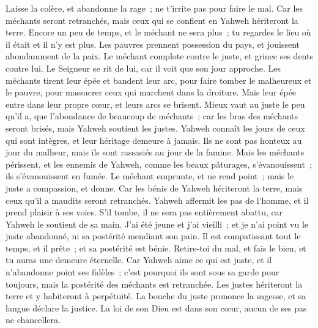 \begin{multicols}{2}
 Laisse la colère, et abandonne la rage~; ne t'irrite pas pour faire le mal.
Car les méchants seront retranchés, mais ceux qui se confient en Yahweh hériteront la terre.
 Encore un peu de temps, et le méchant ne sera plus~; tu regardes le lieu où il était et il n'y est plus.
Les pauvres prennent possession du pays, et jouissent abondamment de la paix.
 Le méchant complote contre le juste, et grince ses dents contre lui.
Le Seigneur se rit de lui, car il voit que son jour approche.
 Les méchants tirent leur épée et bandent leur arc, pour faire tomber le malheureux et le pauvre, pour massacrer ceux qui marchent dans la droiture.
Mais leur épée entre dans leur propre cœur, et leurs arcs se brisent.
 Mieux vaut au juste le peu qu'il a, que l'abondance de beaucoup de méchants~;
car les bras des méchants seront brisés, mais Yahweh soutient les justes.
 Yahweh connaît les jours de ceux qui sont intègres, et leur héritage demeure à jamais.
Ils ne sont pas honteux au jour du malheur, mais ils sont rassasiés au jour de la famine.
 Mais les méchants périssent, et les ennemis de Yahweh, comme les beaux pâturages, s'évanouissent~; ils s'évanouissent en fumée.
 Le méchant emprunte, et ne rend point~; mais le juste a compassion, et donne.
Car les bénis de Yahweh hériteront la terre, mais ceux qu'il a maudits seront retranchés.
 Yahweh affermit les pas de l'homme, et il prend plaisir à ses voies.
S'il tombe, il ne sera pas entièrement abattu, car Yahweh le soutient de sa main.
 J'ai été jeune et j'ai vieilli~; et je n'ai point vu le juste abandonné, ni sa postérité mendiant son pain.
Il est compatissant tout le temps, et il prête~; et sa postérité est bénie.
 Retire-toi du mal, et fais le bien, et tu auras une demeure éternelle.
Car Yahweh aime ce qui est juste, et il n'abandonne point ses fidèles~; c'est pourquoi ils sont sous sa garde pour toujours, mais la postérité des méchants est retranchée.
 Les justes hériteront la terre et y habiteront à perpétuité.
 La bouche du juste prononce la sagesse, et sa langue déclare la justice.
La loi de son Dieu est dans son cœur, aucun de ses pas ne chancellera.

\end{multicols}
